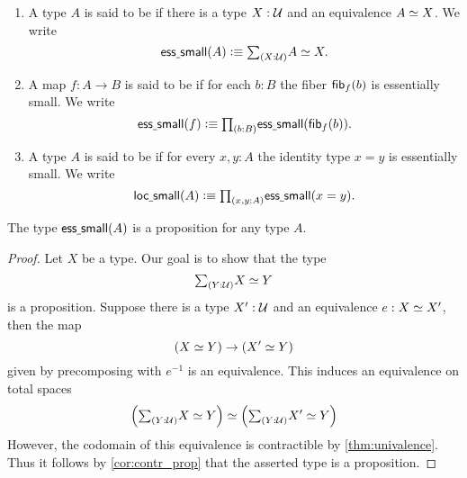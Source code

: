 \begin{defn}
\begin{enumerate}
\item A type $A$ is said to be  if there is a type $X:\mathcal{U}$ and an equivalence $\eqv{A}{X}$. We write
\begin{equation*}
\esssmall(A)\defeq\sm{X:\UU}\eqv{A}{X}.
\end{equation*}
\item A map $f:A\to B$ is said to be  if for each $b:B$ the fiber $\mathsf{fib}_{f}(b)$ is essentially small.
We write
\begin{equation*}
\esssmall(f)\defeq\prd{b:B}\esssmall(\fib{f}{b}).
\end{equation*}
\item A type $A$ is said to be  if for every $x,y:A$ the identity type $x=y$ is essentially small.
We write
\begin{equation*}
\locsmall(A)\defeq \prd{x,y:A}\esssmall(x=y).
\end{equation*}
\end{enumerate}
\end{defn}

\begin{lem}\label{lem:isprop_ess_small}
The type $\mathsf{ess\underline{\ }{}small}(A)$ is a proposition for any type $A$.
\end{lem}

\begin{proof}
Let $X$ be a type. Our goal is to show that the type
\begin{equation*}
\sm{Y:\UU}\eqv{X}{Y}
\end{equation*}
is a proposition. Suppose there is a type $X':\mathcal{U}$ and an equivalence $e:\eqv{X}{X'}$, then the map
\begin{equation*}
(\eqv{X}{Y})\to (\eqv{X'}{Y})
\end{equation*}
given by precomposing with $e^{-1}$ is an equivalence. This induces an equivalence on total spaces
\begin{equation*}
\eqv{\Big(\sm{Y:\UU}\eqv{X}{Y}\Big)}{\Big(\sm{Y:\UU}\eqv{X'}{Y}\Big)}
\end{equation*}
However, the codomain of this equivalence is contractible by \cref{thm:univalence}. Thus it follows by \cref{cor:contr_prop} that the asserted type is a proposition.
\end{proof}

